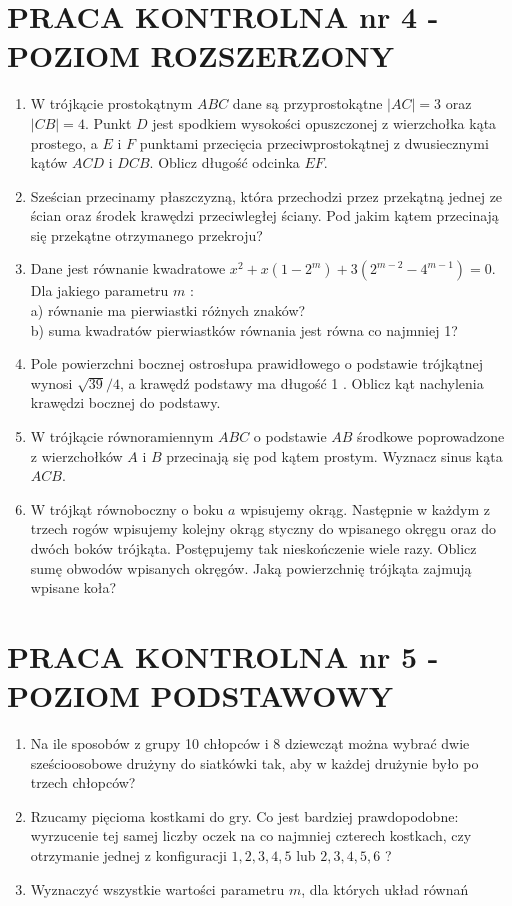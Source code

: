 \documentclass[10pt]{article}
\begin{document}
\section*{PRACA KONTROLNA nr 4 - POZIOM ROZSZERZONY}
\begin{enumerate}
  \item W trójkącie prostokątnym $A B C$ dane są przyprostokątne $|A C|=3$ oraz $|C B|=4$. Punkt $D$ jest spodkiem wysokości opuszczonej z wierzchołka kąta prostego, a $E$ i $F$ punktami przecięcia przeciwprostokątnej z dwusiecznymi kątów $A C D$ i $D C B$. Oblicz długość odcinka $E F$.
  \item Sześcian przecinamy płaszczyzną, która przechodzi przez przekątną jednej ze ścian oraz środek krawędzi przeciwległej ściany. Pod jakim kątem przecinają się przekątne otrzymanego przekroju?
  \item Dane jest równanie kwadratowe $x^{2}+x\left(1-2^{m}\right)+3\left(2^{m-2}-4^{m-1}\right)=0$. Dla jakiego parametru $m$ :\\
a) równanie ma pierwiastki różnych znaków?\\
b) suma kwadratów pierwiastków równania jest równa co najmniej 1?
  \item Pole powierzchni bocznej ostrosłupa prawidłowego o podstawie trójkątnej wynosi $\sqrt{39} / 4$, a krawędź podstawy ma długość 1 . Oblicz kąt nachylenia krawędzi bocznej do podstawy.
  \item W trójkącie równoramiennym $A B C$ o podstawie $A B$ środkowe poprowadzone z wierzchołków $A$ i $B$ przecinają się pod kątem prostym. Wyznacz sinus kąta $A C B$.
  \item W trójkąt równoboczny o boku $a$ wpisujemy okrąg. Następnie w każdym z trzech rogów wpisujemy kolejny okrąg styczny do wpisanego okręgu oraz do dwóch boków trójkąta. Postępujemy tak nieskończenie wiele razy. Oblicz sumę obwodów wpisanych okręgów. Jaką powierzchnię trójkąta zajmują wpisane koła?
\end{enumerate}

\section*{PRACA KONTROLNA nr 5 - POZIOM PODSTAWOWY}
\begin{enumerate}
  \item Na ile sposobów z grupy 10 chłopców i 8 dziewcząt można wybrać dwie sześcioosobowe drużyny do siatkówki tak, aby w każdej drużynie było po trzech chłopców?
  \item Rzucamy pięcioma kostkami do gry. Co jest bardziej prawdopodobne: wyrzucenie tej samej liczby oczek na co najmniej czterech kostkach, czy otrzymanie jednej z konfiguracji $1,2,3,4,5$ lub $2,3,4,5,6$ ?
  \item Wyznaczyć wszystkie wartości parametru $m$, dla których układ równań
\end{enumerate}
\end{document}
